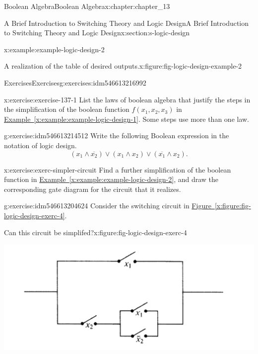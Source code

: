 \documentclass[oneside,10pt,]{book}
\newcommand{\xreffont}{\relax}
\numberwithin{equation}{section}
\begin{document}
\begin{chapterptx}{Boolean Algebra}{}{Boolean Algebra}{}{}{x:chapter:chapter_13}
\begin{sectionptx}{A Brief Introduction to Switching Theory and Logic Design}{}{A Brief Introduction to Switching Theory and Logic Design}{}{}{x:section:s-logic-design}
\begin{example}{}{x:example:example-logic-design-2}
\begin{figureptx}{A realization of the table of desired outputs.}{x:figure:fig-logic-design-example-2}{}
\begin{image}{0.2}{0.6}{0.2}
\end{image}%
\tcblower
\end{figureptx}%
\end{example}
%
%
\typeout{************************************************}
\typeout{************************************************}
%
\begin{exercises-subsection}{Exercises}{}{Exercises}{}{}{g:exercises:idm546613216992}
\begin{divisionexercise}{1}{}{}{x:exercise:exercise-137-1}%
List the laws of boolean algebra that justify the steps in the simplification of the boolean function \(f\left(x_1, x_2, x_3\right)\) in \hyperref[x:example:example-logic-design-1]{Example~{\xreffont\ref{x:example:example-logic-design-1}}}. Some steps use more than one law.%
\end{divisionexercise}%
\begin{divisionexercise}{2}{}{}{g:exercise:idm546613214512}%
Write the following Boolean expression in the notation of logic design.%
\begin{equation*}
\left(x_1\land \overline{x_2}\right)\lor \left(x_1\land x_2\right)\lor \left(\overline{x_1}\land x_2\right).
\end{equation*}
%
\end{divisionexercise}%
\begin{divisionexercise}{3}{}{}{x:exercise:exerc-simpler-circuit}%
Find a further simplification of the boolean function in \hyperref[x:example:example-logic-design-2]{Example~{\xreffont\ref{x:example:example-logic-design-2}}}, and draw the corresponding gate diagram for the circuit that it realizes.%
\end{divisionexercise}%
\begin{divisionexercise}{4}{}{}{g:exercise:idm546613204624}%
Consider the switching circuit in  \hyperref[x:figure:fig-logic-design-exerc-4]{Figure~{\xreffont\ref{x:figure:fig-logic-design-exerc-4}}}.%
\begin{figureptx}{Can this circuit be simplifed?}{x:figure:fig-logic-design-exerc-4}{}%
\begin{image}{0}{1}{0}%
\includegraphics[width=\linewidth]{images/fig-logic-design-exerc-4.png}

\end{image}
\end{figureptx}
\end{divisionexercise}
\end{exercises-subsection}
\end{sectionptx}
\end{chapterptx}
\end{document}
